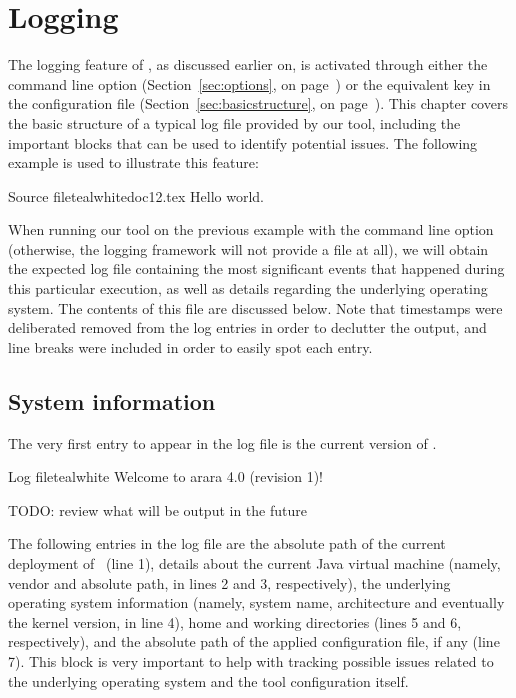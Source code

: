 \chapter{Logging}
\label{chap:logging}

The logging feature of \arara, as discussed earlier on, is activated through either the  command line option (Section~\ref{sec:options}, on page~\pageref{sec:options}) or the equivalent key in the configuration file (Section~\ref{sec:basicstructure}, on page~\pageref{sec:basicstructure}). This chapter covers the basic structure of a typical log file provided by our tool, including the important blocks that can be used to identify potential issues. The following example is used to illustrate this feature:

\begin{ncodebox}{Source file}{teal}{\icnote}{white}{doc12.tex}
Hello world.
\bye
\end{ncodebox}

When running our tool on the previous example with the  command line option (otherwise, the logging framework will not provide a file at all), we will obtain the expected  log file containing the most significant events that happened during this particular execution, as well as details regarding the underlying operating system. The contents of this file are discussed below. Note that timestamps were deliberated removed from the log entries in order to declutter the output, and line breaks were included in order to easily spot each entry.

\section{System information}
\label{sec:systeminformation}

The very first entry to appear in the log file is the current version of \arara. 

\begin{codebox}{Log file}{teal}{\icnote}{white}
Welcome to arara 4.0 (revision 1)!
\end{codebox}

TODO: review what will be output in the future

The following entries in the log file are the absolute path of the current deployment of \arara\ (line 1), details about the current Java virtual machine (namely, vendor and absolute path, in lines 2 and 3, respectively), the underlying operating system information (namely, system name, architecture and eventually the kernel version, in line 4), home and working directories (lines 5 and 6, respectively), and the absolute path of the applied configuration file, if any (line 7). This block is very important to help with tracking possible issues related to the underlying operating system and the tool configuration itself.


